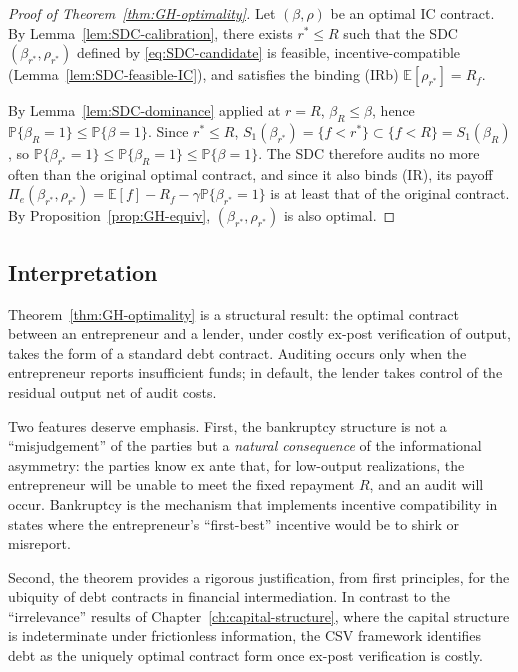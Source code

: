 \documentclass[11pt,a4paper,oneside]{book}
\def\E{\mathbb{E}}
\def\leq{\leqslant}
\renewcommand{\P}{\mathbb{P}}
\theoremstyle{plain}
\theoremstyle{definition}
\theoremstyle{remark}
\numberwithin{equation}{chapter}
\begin{document}
\begin{proof}[Proof of Theorem~\ref{thm:GH-optimality}]
Let $(\beta, \rho)$ be an optimal IC contract.
By Lemma~\ref{lem:SDC-calibration}, there exists $r^\ast \leq R$ such that the SDC $(\beta_{r^\ast}, \rho_{r^\ast})$ defined by \eqref{eq:SDC-candidate} is feasible, incentive-compatible (Lemma~\ref{lem:SDC-feasible-IC}), and satisfies the binding (IRb) $\E[\rho_{r^\ast}] = R_f$.

By Lemma~\ref{lem:SDC-dominance} applied at $r = R$, $\beta_R \leq \beta$, hence $\P\{\beta_R = 1\} \leq \P\{\beta = 1\}$.
Since $r^\ast \leq R$, $S_1(\beta_{r^\ast}) = \{ f < r^\ast \} \subset \{ f < R \} = S_1(\beta_R)$, so $\P\{\beta_{r^\ast} = 1\} \leq \P\{\beta_R = 1\} \leq \P\{\beta = 1\}$.
The SDC therefore audits no more often than the original optimal contract, and since it also binds (IR), its payoff $\Pi_e(\beta_{r^\ast}, \rho_{r^\ast}) = \E[f] - R_f - \gamma \P\{\beta_{r^\ast} = 1\}$ is at least that of the original contract.
By Proposition~\ref{prop:GH-equiv}, $(\beta_{r^\ast}, \rho_{r^\ast})$ is also optimal.
\end{proof}

\subsection{Interpretation}

Theorem~\ref{thm:GH-optimality} is a structural result: the optimal contract between an entrepreneur and a lender, under costly ex-post verification of output, takes the form of a standard debt contract.
Auditing occurs only when the entrepreneur reports insufficient funds; in default, the lender takes control of the residual output net of audit costs.

Two features deserve emphasis.
First, the bankruptcy structure is not a ``misjudgement'' of the parties but a \emph{natural consequence} of the informational asymmetry: the parties know ex ante that, for low-output realizations, the entrepreneur will be unable to meet the fixed repayment $R$, and an audit will occur.
Bankruptcy is the mechanism that implements incentive compatibility in states where the entrepreneur's ``first-best'' incentive would be to shirk or misreport.

Second, the theorem provides a rigorous justification, from first principles, for the ubiquity of debt contracts in financial intermediation.
In contrast to the ``irrelevance'' results of Chapter~\ref{ch:capital-structure}, where the capital structure is indeterminate under frictionless information, the CSV framework identifies debt as the uniquely optimal contract form once ex-post verification is costly.
\end{document}
